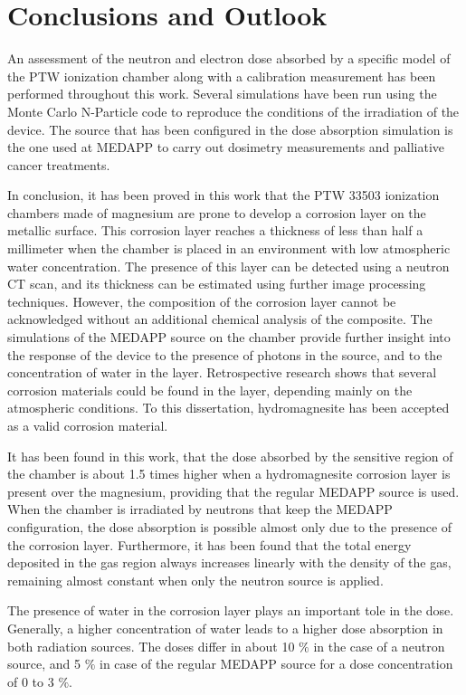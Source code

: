 \chapter{Conclusions and Outlook}

An assessment of the neutron and electron dose absorbed by a specific model of the PTW ionization chamber along with a calibration measurement has been performed throughout this work. Several simulations have been run using the Monte Carlo N-Particle code to reproduce the conditions of the irradiation of the device. The source that has been configured in the dose absorption simulation is the one used at MEDAPP to carry out dosimetry measurements and palliative cancer treatments. 

In conclusion, it has been proved in this work that the PTW 33503 ionization chambers made of magnesium are prone to develop a corrosion layer on the metallic surface. This corrosion layer reaches a thickness of less than half a millimeter when the chamber is placed in an environment with low atmospheric water concentration. The presence of this layer can be detected using a neutron CT scan, and its thickness can be estimated using further image processing techniques. However, the composition of the corrosion layer cannot be acknowledged without an additional chemical analysis of the composite. The simulations of the MEDAPP source on the chamber provide further insight into the response of the device to the presence of photons in the source, and to the concentration of water in the layer. Retrospective research shows that several corrosion materials could be found in the layer, depending mainly on the atmospheric conditions. To this dissertation, hydromagnesite has been accepted as a valid corrosion material.

It has been found in this work, that the dose absorbed by the sensitive region of the chamber is about 1.5 times higher when a hydromagnesite corrosion layer is present over the magnesium, providing that the regular MEDAPP source is used. When the chamber is irradiated by neutrons that keep the MEDAPP configuration, the dose absorption is possible almost only due to the presence of the corrosion layer. Furthermore, it has been found that the total energy deposited in the gas region always increases linearly with the density of the gas, remaining almost constant when only the neutron source is applied. 

The presence of water in the corrosion layer plays an important tole in the dose. Generally, a higher concentration of water leads to a higher dose absorption in both radiation sources. The doses differ in about 10 $\%$ in the case of a neutron source, and 5 $\%$ in case of the regular MEDAPP source for a dose concentration of 0 to 3 $\%$. 

